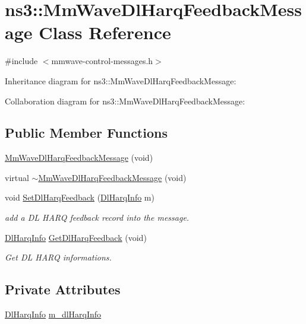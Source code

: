 \hypertarget{classns3_1_1MmWaveDlHarqFeedbackMessage}{}\section{ns3\+:\+:Mm\+Wave\+Dl\+Harq\+Feedback\+Message Class Reference}
\label{classns3_1_1MmWaveDlHarqFeedbackMessage}


{\ttfamily \#include $<$mmwave-\/control-\/messages.\+h$>$}



Inheritance diagram for ns3\+:\+:Mm\+Wave\+Dl\+Harq\+Feedback\+Message\+:


Collaboration diagram for ns3\+:\+:Mm\+Wave\+Dl\+Harq\+Feedback\+Message\+:
\subsection*{Public Member Functions}
\begin{DoxyCompactItemize}
\item 
\hyperlink{classns3_1_1MmWaveDlHarqFeedbackMessage_ae9407e43a06bf0c8623580b76267f942}{Mm\+Wave\+Dl\+Harq\+Feedback\+Message} (void)
\item 
virtual \hyperlink{classns3_1_1MmWaveDlHarqFeedbackMessage_a4154a47d56188218e3e159473e9b08ab}{$\sim$\+Mm\+Wave\+Dl\+Harq\+Feedback\+Message} (void)
\item 
void \hyperlink{classns3_1_1MmWaveDlHarqFeedbackMessage_a7f55dcc4d304904cf8e155cf7d15bcca}{Set\+Dl\+Harq\+Feedback} (\hyperlink{structns3_1_1DlHarqInfo}{Dl\+Harq\+Info} m)
\begin{DoxyCompactList}\small\item\em add a DL H\+A\+RQ feedback record into the message. \end{DoxyCompactList}\item 
\hyperlink{structns3_1_1DlHarqInfo}{Dl\+Harq\+Info} \hyperlink{classns3_1_1MmWaveDlHarqFeedbackMessage_a25fade58f2f5b47f37615c6b38caad11}{Get\+Dl\+Harq\+Feedback} (void)
\begin{DoxyCompactList}\small\item\em Get DL H\+A\+RQ informations. \end{DoxyCompactList}\end{DoxyCompactItemize}
\subsection*{Private Attributes}
\begin{DoxyCompactItemize}
\item 
\hyperlink{structns3_1_1DlHarqInfo}{Dl\+Harq\+Info} \hyperlink{classns3_1_1MmWaveDlHarqFeedbackMessage_a066880da20940de59970ac3d61ab67c9}{m\+\_\+dl\+Harq\+Info}
\end{DoxyCompactItemize}
